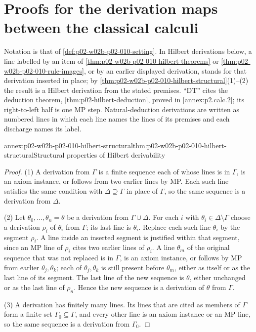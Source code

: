 \section{Proofs for the derivation maps between the classical calculi}
\label{sec:annex-p02-w02b-p02-010-translations}

Notation is that of \cref{def:p02-w02b-p02-010-setting}.  In Hilbert
derivations below, a line labelled by an item of
\cref{thm:p02-w02b-p02-010-hilbert-theorems} or
\cref{thm:p02-w02b-p02-010-rule-images}, or by an earlier displayed
derivation, stands for that derivation inserted in place; by
\cref{thm:p02-w02b-p02-010-hilbert-structural}(1)--(2) the result is a
Hilbert derivation from the stated premises.  ``DT'' cites the deduction
theorem, \cref{thm:p02-hilbert-deduction}, proved in \cref{annex:p2.calc.2};
its right-to-left half is one MP step.  Natural-deduction derivations are
written as numbered lines in which each line names the lines of its
premises and each discharge names its label.

\begin{annexitem}{annex:p02-w02b-p02-010-hilbert-structural}{thm:p02-w02b-p02-010-hilbert-structural}{Structural properties of Hilbert derivability}
\begin{proof}
(1) A derivation from \(\Gamma\) is a finite sequence each of whose lines is
in \(\Gamma\), is an axiom instance, or follows from two earlier lines by MP.
Each such line satisfies the same condition with \(\Delta\supseteq\Gamma\) in
place of \(\Gamma\), so the same sequence is a derivation from \(\Delta\).

(2) Let \(\theta_0,\ldots,\theta_n=\theta\) be a derivation from
\(\Gamma\cup\Delta\).  For each \(i\) with \(\theta_i\in\Delta\setminus\Gamma\)
choose a derivation \(\rho_i\) of \(\theta_i\) from \(\Gamma\); its last line
is \(\theta_i\).  Replace each such line \(\theta_i\) by the segment
\(\rho_i\).  A line inside an inserted segment is justified within that segment,
since an MP line of \(\rho_i\) cites two earlier lines of \(\rho_i\).  A line
\(\theta_m\) of the original sequence that was not replaced is in
\(\Gamma\), is an axiom instance, or follows by MP from earlier
\(\theta_j,\theta_k\); each of \(\theta_j,\theta_k\) is still present before
\(\theta_m\), either as itself or as the last line of its segment.  The last
line of the new sequence is \(\theta\), either unchanged or as the last
line of \(\rho_n\).  Hence the new sequence is a derivation of \(\theta\)
from \(\Gamma\).

(3) A derivation has finitely many lines.  Its lines that are cited as
members of \(\Gamma\) form a finite set \(\Gamma_0\subseteq\Gamma\), and
every other line is an axiom instance or an MP line, so the same sequence
is a derivation from \(\Gamma_0\).
\end{proof}
\end{annexitem}

